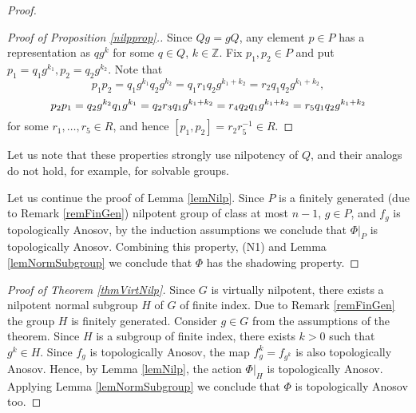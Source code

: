 \begin{proof}
\begin{proof}[Proof of Proposition \ref{nilpprop}.]
Since $Qg=gQ$, any element $p\in P$ has a representation as $qg^k$ for some $q\in Q$, $k\in\mathbb{Z}$. Fix $p_1,p_2\in P$ and put $p_1=q_1g^{k_1}, p_2=q_2g^{k_2}$.
Note that
$$
p_1p_2=q_1g^{k_1} q_2g^{k_2} = q_1r_1q_2g^{k_1+k_2} = r_2q_1q_2g^{k_1+k_2},
$$
\begin{equation}\notag
p_2p_1 = q_2g^{k_2}q_1g^{k_1} = q_2r_3q_1g^{k_1 + k_2} = r_4q_2q_1g^{k_1+k_2} = r_5q_1q_2g^{k_1+k_2}
\end{equation}
for some $r_1, \dots, r_5 \in R$, and hence $[p_1,p_2] = r_2r_5^{-1}\in R.$




\end{proof}

Let us note that these properties strongly use nilpotency of $Q$, and their analogs do not hold, for example, for solvable groups.

Let us continue the proof of Lemma \ref{lemNilp}. Since $P$ is a finitely generated (due to Remark \ref{remFinGen}) nilpotent group of class at most $n-1$, $g \in P$, and $f_g$ is topologically Anosov, by the induction assumptions we conclude that $\Phi|_P$ is topologically Anosov. Combining this property, (N1) and Lemma \ref{lemNormSubgroup} we conclude that $\Phi$ has the shadowing property.
\end{proof}

\begin{proof}[Proof of Theorem \ref{thmVirtNilp}]
Since $G$ is virtually nilpotent, there exists a nilpotent normal subgroup $H$ of $G$ of finite index. Due to Remark \ref{remFinGen} the group $H$ is finitely generated. Consider $g\in G$ from the assumptions of the theorem. Since $H$ is a subgroup of finite index, there exists $k > 0$ such that $g^k \in H$. Since $f_g$ is topologically Anosov, the map $f_g^k = f_{g^k}$ is also topologically Anosov. Hence, by Lemma \ref{lemNilp}, the action $\Phi|_{H}$ is topologically Anosov. Applying Lemma \ref{lemNormSubgroup} we conclude that $\Phi$ is topologically Anosov too.
\end{proof}


